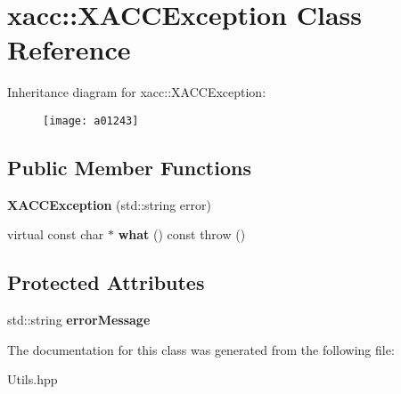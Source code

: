 \hypertarget{a01243}{}\section{xacc\+:\+:X\+A\+C\+C\+Exception Class Reference}
\label{a01243}
Inheritance diagram for xacc\+:\+:X\+A\+C\+C\+Exception\+:\begin{figure}[H]
\begin{center}
\leavevmode
\texttt{[image: a01243]}
\end{center}
\end{figure}
\subsection*{Public Member Functions}
\begin{DoxyCompactItemize}
\item 
\mbox{\label{a01243_ab62415ce6e1dd25fb1a074f5741007c9}} 
{\bfseries X\+A\+C\+C\+Exception} (std\+::string error)
\item 
\mbox{\label{a01243_a86612df9215beec1933229c5dddc12e5}} 
virtual const char $\ast$ {\bfseries what} () const  throw ()
\end{DoxyCompactItemize}
\subsection*{Protected Attributes}
\begin{DoxyCompactItemize}
\item 
\mbox{\label{a01243_a31f64c6fb215570571b9b4a3d47eadd0}} 
std\+::string {\bfseries error\+Message}
\end{DoxyCompactItemize}


The documentation for this class was generated from the following file\+:\begin{DoxyCompactItemize}
\item 
Utils.\+hpp\end{DoxyCompactItemize}
